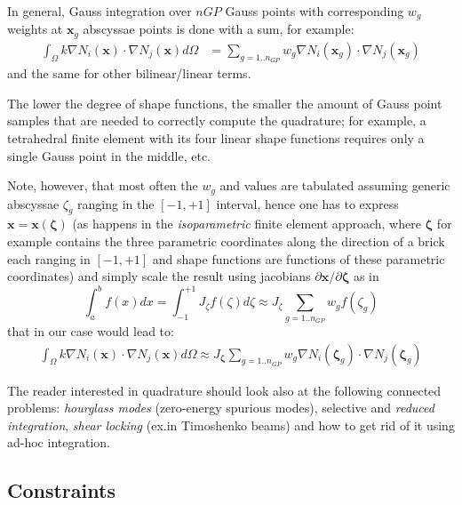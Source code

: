 \documentclass{digitaldynamics}
\def\vect#1{\bm{#1}}
\begin{document}
In general, Gauss integration over $n{GP}$ Gauss points with corresponding $w_g$ weights at $\vect{x}_g$ abscyssae points is done with a sum, for example:
\begin{align*}
\int_\Omega k \nabla N_i(\vect{x}) \cdot \nabla N_j(\vect{x}) d\Omega &= \sum_{g=1..n_{GP}} w_g \nabla N_i(\vect{x}_g) \cdot \nabla N_j(\vect{x}_g)
\end{align*}
and the same for other bilinear/linear terms.
 
The lower the degree of shape functions, the smaller the amount of Gauss point samples that are needed to correctly compute the quadrature; for example, a tetrahedral finite element with its four linear shape functions requires only a single Gauss point in the middle, etc. 

Note, however, that most often the $w_g$ and values are tabulated assuming generic abscyssae $\zeta_g$ ranging in the $[-1,+1]$ interval, hence one has to express $\vect{x}=\vect{x}(\vect{\zeta})$ (as happens in the \textit{isoparametric} finite element approach, where $\vect{\zeta}$ for example contains the three parametric coordinates along the direction of a brick each ranging in $[-1,+1]$ and shape functions are functions of these parametric coordinates) and simply scale the result using jacobians $\partial\vect{x}/\partial\vect{\zeta}$ as in
\[
\int_a^b f(x) dx = \int_{-1}^{+1} J_{\zeta} f(\zeta) d\zeta \approx J_{\zeta} \sum_{g=1..n_{GP}} w_g f(\zeta_g)
\]
that in our case would lead to:
\begin{align*}
\int_\Omega k \nabla N_i(\vect{x}) \cdot \nabla N_j(\vect{x}) d\Omega \approx J_{\vect{\zeta}} \sum_{g=1..n_{GP}} w_g \nabla N_i(\vect{\zeta}_g) \cdot \nabla N_j(\vect{\zeta}_g)
\end{align*} 

The reader interested in quadrature should look also at the following connected problems: \textit{hourglass modes} (zero-energy spurious modes), selective and \textit{reduced integration}, \textit{shear locking} (ex.in Timoshenko beams) and how to get rid of it using ad-hoc integration.


\subsection{Constraints}
\end{document}
